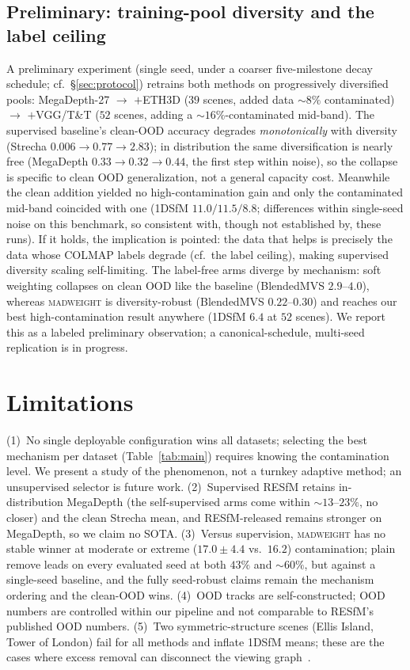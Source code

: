 \documentclass[10pt,twocolumn,letterpaper]{article}
\newcommand{\mad}{\textsc{madweight}}
\begin{document}
\subsection{Preliminary: training-pool diversity and the label ceiling}
A preliminary experiment (single seed, under a coarser five-milestone decay schedule;
cf.\ \S\ref{sec:protocol}) retrains both methods on progressively diversified pools: MegaDepth-27
$\to$ $+$ETH3D ($39$ scenes, added data ${\sim}8\%$ contaminated) $\to$ $+$VGG/T\&T ($52$
scenes, adding a ${\sim}16\%$-contaminated mid-band). The supervised baseline's clean-OOD
accuracy degrades \emph{monotonically} with diversity (Strecha
$0.006\!\to\!0.77\!\to\!2.83$); in distribution the same diversification is nearly
free (MegaDepth $0.33\!\to\!0.32\!\to\!0.44$, the first step within noise), so the
collapse is specific to clean OOD generalization, not a general capacity cost. Meanwhile the clean addition yielded no high-contamination
gain and only the contaminated mid-band coincided with one (1DSfM $11.0/11.5/8.8$;
differences within single-seed noise on this benchmark, so consistent with, though not
established by, these runs). If it holds, the implication is pointed: the data that
helps is precisely the data whose COLMAP labels degrade (cf.\ the label ceiling), making
supervised diversity scaling self-limiting. The
label-free arms diverge by mechanism: soft weighting collapses on clean OOD like the
baseline (BlendedMVS $2.9$--$4.0$), whereas \mad{} is diversity-robust (BlendedMVS
$0.22$--$0.30$) and reaches our best high-contamination result anywhere (1DSfM $6.4$ at
$52$ scenes). We report this as a labeled preliminary observation; a canonical-schedule,
multi-seed replication is in progress.

\section{Limitations}
(1)~No single deployable configuration wins all datasets; selecting the best mechanism per
dataset (Table~\ref{tab:main}) requires knowing the contamination level. We present a study
of the phenomenon, not a turnkey adaptive method; an unsupervised selector is future work.
(2)~Supervised RESfM retains in-distribution MegaDepth (the self-supervised arms come
within $\sim\!13$--$23\%$, no closer) and the clean Strecha mean, and RESfM-released
remains stronger on MegaDepth, so we claim no SOTA. (3)~Versus supervision, \mad{} has no stable winner at moderate or extreme
($17.0\pm4.4$ vs.\ $16.2$) contamination; plain remove leads on every evaluated seed at
both $43\%$ and $\sim\!60\%$, but against a single-seed baseline, and the fully
seed-robust claims remain the mechanism ordering and the clean-OOD wins.
(4)~OOD tracks are self-constructed; OOD numbers are controlled within our pipeline
and not comparable to RESfM's published OOD numbers. (5)~Two symmetric-structure scenes (Ellis Island, Tower of London) fail for all
methods and inflate 1DSfM means; these are the cases where excess removal can disconnect
the viewing graph~\cite{resfm}.
\end{document}
